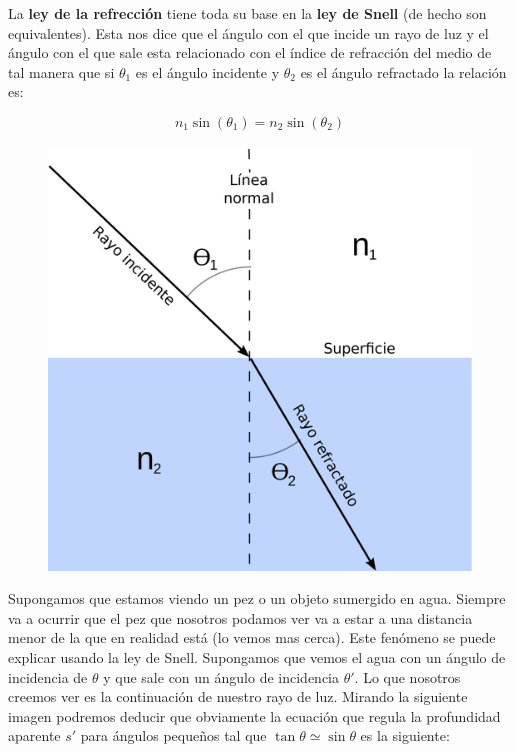 \documentclass[12pt,a4paper]{article}
\numberwithin{equation}{section}
\numberwithin{figure}{section}
\begin{document}
La \textbf{ley de la refrección} tiene toda su base en la \textbf{ley de Snell} (de hecho son equivalentes). Esta nos dice que el ángulo con el que incide un rayo de luz y el ángulo con el que sale esta relacionado con el índice de refracción del medio de tal manera que si $\theta_1$ es el ángulo incidente y $\theta_2$ es el ángulo refractado la relación es:

\begin{equation}
n_1 \sin (\theta_1) = n_2 \sin (\theta_2)
\end{equation}

\begin{figure}[h!] \centering
\includegraphics[scale=0.08]{Refracción.pdf}
\end{figure}

Supongamos que estamos viendo un pez o un objeto sumergido en agua. Siempre va a ocurrir que el pez que nosotros podamos ver va a estar a una distancia menor de la que en realidad está (lo vemos mas cerca). Este fenómeno se puede explicar usando la ley de Snell. Supongamos que vemos el agua con un ángulo de incidencia de $\theta$ y que sale con un ángulo de incidencia $\theta'$. Lo que nosotros creemos ver es la continuación de nuestro rayo de luz. Mirando la siguiente imagen podremos deducir que obviamente la ecuación que regula la profundidad aparente $s'$ para ángulos pequeños tal que $ \tan \theta \simeq \sin \theta $  es la siguiente:
\end{document}
